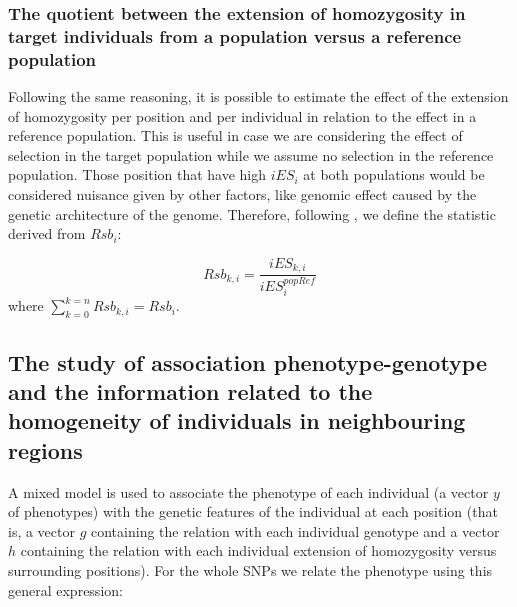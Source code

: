 \documentclass[a4paper,11pt]{article}
\begin{document}
\subsubsection{The quotient between the extension of homozygosity in target individuals from a population versus a reference population}
Following the same reasoning, it is possible to estimate the effect of the extension of homozygosity per position and per individual in relation to the effect in a reference population. This is useful in case we are considering the effect of selection in the target population while we assume no selection in the reference population. Those position that have high $iES_i$ at both populations would be considered nuisance given by other factors, like genomic effect caused by the genetic architecture of the genome. Therefore, following \citep{Tang:2007aa}, we define the statistic derived from $Rsb_i$:

\begin{equation}
Rsb_{k,i} = \frac{iES_{k,i}}{iES_{i}^{popRef}}
\end{equation}
where $\sum_{k=0}^{k=n}Rsb_{k,i} = Rsb_i.$

\subsection{The study of association phenotype-genotype and the information related to the homogeneity of individuals in neighbouring regions}

A mixed model is used to associate the phenotype of each individual (a vector $y$ of phenotypes) with the genetic features of the individual at each position (that is, a vector $g$ containing the relation with each individual genotype and a vector $h$ containing the relation with each individual extension of homozygosity versus surrounding positions). For the whole SNPs we relate the phenotype using this general expression:
\end{document}
